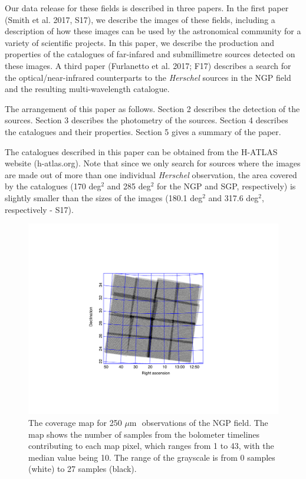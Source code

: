 \documentclass[useAMS,usenatbib]{mn2e}
\def\mic{ $\mu $m\,}
\begin{document}
Our data release for these fields is
described in three papers. In the first paper (Smith et al. 2017, S17), we describe
the images of these fields, including a description of how these
images can be used by the astronomical community for a variety of scientific
projects.
In this paper, we describe the production and
properties of the catalogues of 
far-infared and submillimetre sources detected on these images. A third paper
(Furlanetto et al. 2017; F17) describes a search for the optical/near-infrared counterparts
to the {\it Herschel} sources in the NGP field and the resulting multi-wavelength catalogue.

The arrangement of this paper as follows. Section 2 
describes the
detection of the sources. Section 3 describes the 
photometry of the sources. Section 4 describes the catalogues
and their properties.
Section 5 gives a summary of the paper.

The catalogues described in this paper can be obtained from the 
H-ATLAS website (h-atlas.org).
Note that since we only search for sources where the images
are made out of more than one individual {\it Herschel} observation,
the area covered by the catalogues (170 deg$^2$ and 285 deg$^2$ for the
NGP and SGP, respectively) is slightly smaller than the
sizes of the images (180.1 deg$^2$ and 317.6 deg$^2$, respectively - S17).

\begin{figure} %
\includegraphics[scale=0.7]{ngpcoverage.pdf}
\caption{\protect\label{skymapn} The coverage map for 250\mic\ observations
of the NGP field.
The map shows the number of samples from the bolometer timelines contributing
to each map pixel, which ranges from 1 to 43, with the median value being 10.
The range of the grayscale is from 0 samples (white) to 27 samples
(black).}

\end{figure}
\end{document}
